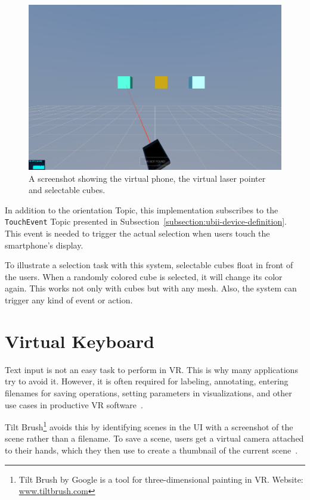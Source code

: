\begin{figure}[H]
	\centering
	\includegraphics[width=12cm]{figures/experiments/screenshot_exp_lp.png}
	\caption[Screenshot of the laser pointer]{A screenshot showing the virtual phone, the virtual laser pointer and selectable cubes.}\label{fig:screenshot-exp-lp}
\end{figure}

In addition to the orientation Topic, this implementation subscribes to the \lstinline{TouchEvent} Topic presented in Subsection~\ref{subsection:ubii-device-definition}. This event is needed to trigger the actual selection when users touch the smartphone's display.

To illustrate a selection task with this system, selectable cubes float in front of the users. 
When a randomly colored cube is selected, it will change its color again. This works not only with cubes but with any mesh. Also, the system can trigger any kind of event or action.


\section{Virtual Keyboard}\label{section:virtual-keyboard}

Text input is not an easy task to perform in \gls{VR}. This is why many applications try to avoid it. However, it is often required for labeling, annotating, entering filenames for saving operations, setting parameters in visualizations, and other use cases in productive \gls{VR} software~\cite[2154]{Rhoton.2002}. 

Tilt Brush\footnote{Tilt Brush by Google is a tool for three-dimensional painting in VR. Website: \href{https://www.tiltbrush.com/}{www.tiltbrush.com}} avoids this by identifying scenes in the \gls{UI} with a screenshot of the scene rather than a filename. To save a scene, users get a virtual camera attached to their hands, which they then use to create a thumbnail of the current scene~\cite{GoogleLLC.2019}. %

